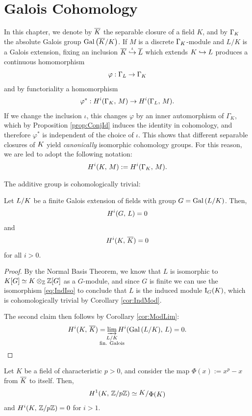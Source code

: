 \documentclass[a4paper, oneside]{memoir}
\begin{document}
\section{Galois Cohomology}
In this chapter, we denote by $\overline{K}$ the separable closure of a field $K$, and by $\Gamma_K$ the absolute Galois group $\operatorname{Gal}\left( \overline{K}/K \right)$. If $M$ is a discrete $\Gamma_K$-module and $L/K$ is a Galois extension, fixing an inclusion $\overline{K}\overset{\iota}{\hookrightarrow} \overline{L}$ which extends $K\hookrightarrow L$ produces a continuous homomorphism
\[
	\varphi:\Gamma_L\to\Gamma_K
\]
and by functoriality a homomorphism
\[
	\varphi^*:H^{i}( \Gamma_K, \, M )\to H^{i}( \Gamma_L, \, M ).
\]
If we change the inclusion $\iota$, this changes $\varphi$ by an inner automorphism of $\Gamma_K$, which by Proposition \ref{prop:ConjId} induces the identity in cohomology, and therefore $\varphi^*$ is independent of the choice of $\iota$. This shows that different separable closures of $K$ yield \textit{canonically} isomorphic cohomology groups. For this reason, we are led to adopt the following notation:
\[
	H^{i}( K, \, M ):=H^{i}( \Gamma_K, \, M ).
\]

The additive group is cohomologically trivial:
\begin{proposition}
	Let $L/K$ be a finite Galois extension of fields with group $G=\operatorname{Gal}{(L/K)}$. Then,
	\[
		H^{i}( G, \, L )=0
	\]
	and
	\[
		H^{i}( K, \, \overline{K} )=0
	\]
	for all $i>0$.
\end{proposition}

\begin{proof}
	By the Normal Basis Theorem, we know that $L$ is isomorphic to $K[G]\simeq K\otimes_{\mathbb{Z}} \mathbb{Z}[G]$ as a $G$-module, and since $G$ is finite we can use the isomorphism \eqref{eq:IndIso} to conclude that $L$ is the induced module $\operatorname{I}_{G}(K)$, which is cohomologically trivial by Corollary \ref{cor:IndMod}.

	The second claim then follows by Corollary \ref{cor:ModLim}:
	\[
		\H{i}{\K}{\Ks}= \varinjlim_{\mathclap{\substack{L/\K\\\text{fin. Galois}}}}{\H{i}{\operatorname{Gal}{(L/\K)}}{L}}=0.
	\]
\end{proof}

\begin{proposition}\label{prop:ArtinSchreier}
	Let $K$ be a field of characteristic $p>0$, and consider the map $\Phi(x):=x^p-x$ from $\overline{K}$ to itself.
	Then,
	\[
		\H{1}{\K}{\Z/{p\Z}}\simeq \ssfrac{\K}{\Phi(\K)}
	\]
	and $H^{i}( K, \, \mathbb{Z}/{p\mathbb{Z}} )=0$ for $i>1$.
\end{proposition}
\end{document}

